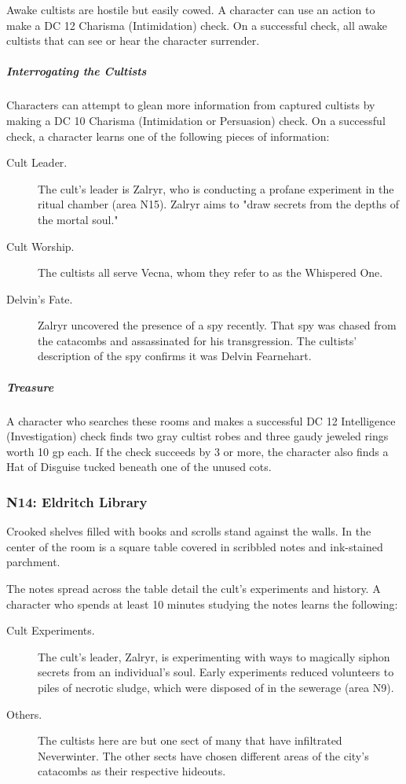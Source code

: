 \documentclass[10pt,a4paper,twoside,bg=print,twocolumn,openany,nodeprecatedcode]{dndbook}
\begin{document}
Awake cultists are hostile but easily cowed. A character can use an action to make a DC 12 Charisma (Intimidation) check. On a successful check, all awake cultists that can see or hear the character surrender.
\subparagraph{Interrogating the Cultists}
Characters can attempt to glean more information from captured cultists by making a DC 10 Charisma (Intimidation or Persuasion) check. On a successful check, a character learns one of the following pieces of information:

\begin{description}
\item[Cult Leader.]
The cult's leader is Zalryr, who is conducting a profane experiment in the ritual chamber (area N15). Zalryr aims to "draw secrets from the depths of the mortal soul."
\item[Cult Worship.]
The cultists all serve Vecna, whom they refer to as the Whispered One.
\item[Delvin's Fate.]
Zalryr uncovered the presence of a spy recently. That spy was chased from the catacombs and assassinated for his transgression. The cultists' description of the spy confirms it was Delvin Fearnehart.
\end{description}

\subparagraph{Treasure}
A character who searches these rooms and makes a successful DC 12 Intelligence (Investigation) check finds two gray cultist robes and three gaudy jeweled rings worth 10 gp each. If the check succeeds by 3 or more, the character also finds a Hat of Disguise tucked beneath one of the unused cots.
\subsubsection{N14: Eldritch Library}
\begin{DndReadAloud}{}
Crooked shelves filled with books and scrolls stand against the walls. In the center of the room is a square table covered in scribbled notes and ink-stained parchment.
\end{DndReadAloud}

The notes spread across the table detail the cult's experiments and history. A character who spends at least 10 minutes studying the notes learns the following:

\begin{description}
\item[Cult Experiments.]
The cult's leader, Zalryr, is experimenting with ways to magically siphon secrets from an individual's soul. Early experiments reduced volunteers to piles of necrotic sludge, which were disposed of in the sewerage (area N9).

\item[Others.]
The cultists here are but one sect of many that have infiltrated Neverwinter. The other sects have chosen different areas of the city's catacombs as their respective hideouts.

\end{description}
\end{document}
